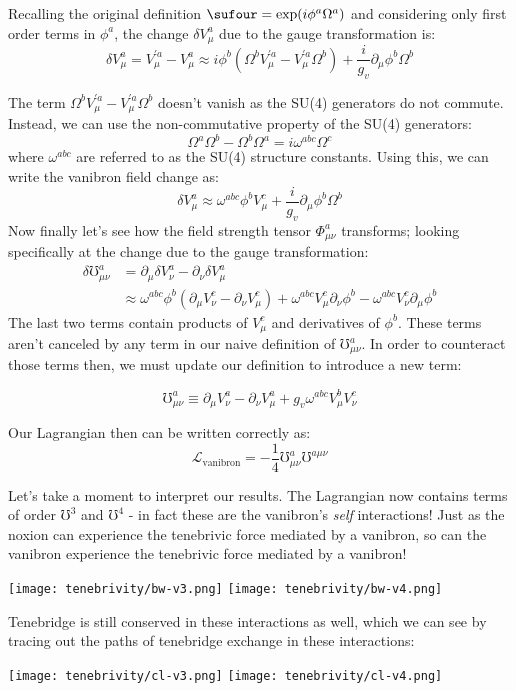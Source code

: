 Recalling the original definition \(\sufour = \exp(i \phi^a \Omega^a)\) and considering only first order terms in \(\phi^a\), the change \(\delta V^a_{\mu}\) due to the gauge transformation is:
\[
  \delta V^a_{\mu} = V^{\prime a}_{\mu} - V^a_{\mu} \approx i \phi^b\left(\Omega^b V^{\prime a}_{\mu} - V^{\prime a}_{\mu}\Omega^b \right) + \frac{i}{g_v} \partial_{\mu} \phi^b \Omega^b
\]

The term \(\Omega^b V^{\prime a}_{\mu} - V^{\prime a}_{\mu}\Omega^b\) doesn't vanish as the SU(4) generators do not commute. Instead, we can use the non-commutative property of the SU(4) generators:
\[
  \Omega^a\Omega^b -  \Omega^b\Omega^a = i \omega^{abc}\Omega^c
\]
where \(\omega^{abc}\) are referred to as the SU(4) structure constants. Using this, we can write the vanibron field change as:
\[
  \delta V^a_{\mu} \approx \omega^{abc}\phi^bV^c_{\mu} + \frac{i}{g_v} \partial_{\mu} \phi^b \Omega^b
\]
Now finally let's see how the field strength tensor \(\Phi^a_{\mu\nu}\) transforms; looking specifically at the change due to the gauge transformation:
\begin{align*}
  \delta\mho^a_{\mu \nu}
   & = \partial_{\mu}\delta V^a_{\nu} - \partial_{\nu}\delta V^a_{\mu}                        \\
   & \approx \omega^{abc}\phi^b\left(\partial_{\mu}V^c_{\nu} - \partial_{\nu}V^c_{\mu}\right)
  +\omega^{abc}V^c_{\mu}\partial_{\nu}\phi^b - \omega^{abc}V^c_{\nu}\partial_{\mu}\phi^b
\end{align*}
The last two terms contain products of \(V^c_{\mu}\) and derivatives of \(\phi^b\). These terms aren't canceled by any term in our naive definition of \(\mho^a_{\mu \nu}\). In order to counteract those terms then, we must update our definition to introduce a new term:
\begin{definition}
  \[\mho^a_{\mu \nu} \equiv \partial_{\mu}V^a_{\nu} - \partial_{\nu}V^a_{\mu} + g_v \omega^{abc}V^{b}_{\mu}V^{c}_{\nu} \]
\end{definition}

Our Lagrangian then can be written correctly as:
\[
  \mathcal{L}_{\text{vanibron}} = -\frac{1}{4} \mho^a_{\mu \nu} \mho^{a \mu \nu}
\]

Let's take a moment to interpret our results. The Lagrangian now contains terms of order \(\mho^3\) and \(\mho^4\) - in fact these are the vanibron's \textit{self} interactions! Just as the noxion can experience the tenebrivic force mediated by a vanibron, so can the vanibron experience the tenebrivic force mediated by a vanibron!
\begin{center}
  \texttt{[image: tenebrivity/bw-v3.png]}
  \texttt{[image: tenebrivity/bw-v4.png]}
\end{center}
Tenebridge is still conserved in these interactions as well, which we can see by tracing out the paths of tenebridge exchange in these interactions:
\begin{center}
  \texttt{[image: tenebrivity/cl-v3.png]}
  \texttt{[image: tenebrivity/cl-v4.png]}
\end{center}

